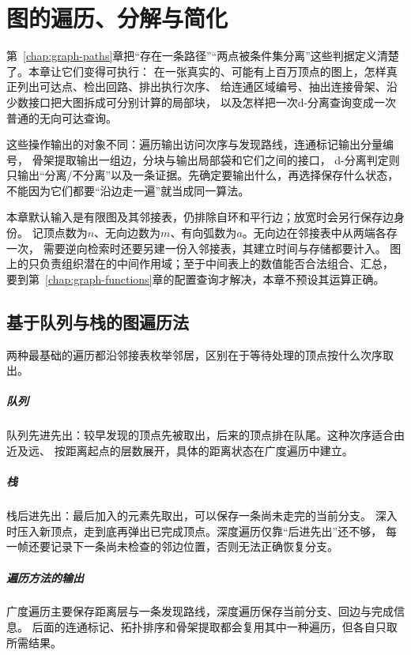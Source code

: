 \chapter{图的遍历、分解与简化}
\label{chap:graph-traversal}

第~\ref{chap:graph-paths}章把“存在一条路径”“两点被条件集分离”这些判据定义清楚了。本章让它们变得可执行：
在一张真实的、可能有上百万顶点的图上，怎样真正列出可达点、检出回路、排出执行次序、
给连通区域编号、抽出连接骨架、沿少数接口把大图拆成可分别计算的局部块，
以及怎样把一次d-分离查询变成一次普通的无向可达查询。

这些操作输出的对象不同：遍历输出访问次序与发现路线，连通标记输出分量编号，
骨架提取输出一组边，分块与输出局部袋和它们之间的接口，
d-分离判定则只输出“分离/不分离”以及一条证据。先确定要输出什么，再选择保存什么状态，
不能因为它们都要“沿边走一遍”就当成同一算法。

本章默认输入是有限图及其邻接表，仍排除自环和平行边；放宽时会另行保存边身份。
记顶点数为$n$、无向边数为$m$、有向弧数为$a$。无向边在邻接表中从两端各存一次，
需要逆向检索时还要另建一份入邻接表，其建立时间与存储都要计入。
图上的只负责组织潜在的中间作用域；至于中间表上的数值能否合法组合、汇总，
要到第~\ref{chap:graph-functions}章的配置查询才解决，本章不预设其运算正确。

\section{基于队列与栈的图遍历法}

两种最基础的遍历都沿邻接表枚举邻居，区别在于等待处理的顶点按什么次序取出。

\paragraph{队列}
队列先进先出：较早发现的顶点先被取出，后来的顶点排在队尾。这种次序适合由近及远、
按距离起点的层数展开，具体的距离状态在广度遍历中建立。

\paragraph{栈}
栈后进先出：最后加入的元素先取出，可以保存一条尚未走完的当前分支。
深入时压入新顶点，走到底再弹出已完成顶点。深度遍历仅靠“后进先出”还不够，
每一帧还要记录下一条尚未检查的邻边位置，否则无法正确恢复分支。

\paragraph{遍历方法的输出}
广度遍历主要保存距离层与一条发现路线，深度遍历保存当前分支、回边与完成信息。
后面的连通标记、拓扑排序和骨架提取都会复用其中一种遍历，但各自只取所需结果。

